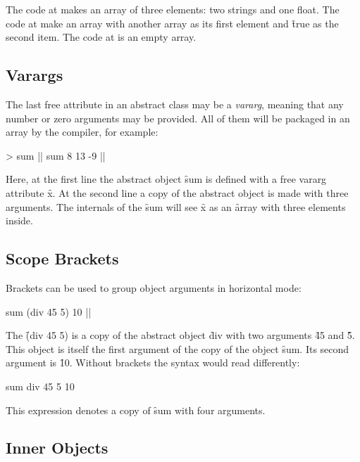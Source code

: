 The code at  makes an array of three elements: two strings
and one float. The code at  make an array with another
array as its first element and \f{true} as the second item.
The code at  is an empty array.

\subsection{Varargs}

The last free attribute in an abstract class may be a \emph{vararg},
meaning that any number or zero arguments may be provided. All of them
will be packaged in an array by the compiler, for example:

\begin{eocode}
[x...] > sum |$\label{ln:sum-def}$|
sum 8 13 -9 |$\label{ln:sum-instance}$|
\end{eocode}

Here, at the first line the abstract object \f{sum} is defined
with a free vararg attribute \f{x}. At the second line a copy of the
abstract object is made with three arguments. The internals of
the \f{sum} will see \f{x} as an \f{array} with three
elements inside.

\subsection{Scope Brackets}

Brackets can be used to group object arguments in horizontal mode:

\begin{eocode}
sum (div 45 5) 10  |$\label{ln:sum}$|
\end{eocode}

The \f{(div 45 5)} is a copy of the abstract object \f{div}
with two arguments \f{45} and \f{5}. This object is itself
the first argument of the copy of the object \f{sum}. Its second
argument is \f{10}. Without brackets the syntax would read differently:

\begin{eocode}
sum div 45 5 10
\end{eocode}

This expression denotes a copy of \f{sum} with four arguments.

\subsection{Inner Objects}

